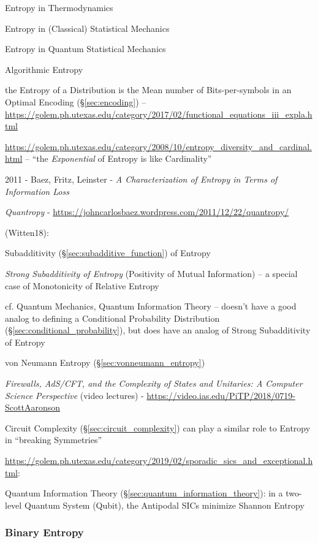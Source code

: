 Entropy in Thermodynamics

Entropy in (Classical) Statistical Mechanics

Entropy in Quantum Statistical Mechanics

Algorithmic Entropy

the Entropy of a Distribution is the Mean number of Bits-per-symbols in an
Optimal Encoding (\S\ref{sec:encoding}) --
\url{https://golem.ph.utexas.edu/category/2017/02/functional_equations_iii_expla.html}

\url{https://golem.ph.utexas.edu/category/2008/10/entropy_diversity_and_cardinal.html}
-- ``the \emph{Exponential} of Entropy is like Cardinality''

2011 - Baez, Fritz, Leinster - \emph{A Characterization of Entropy in Terms of
  Information Loss}

\emph{Quantropy} -
\url{https://johncarlosbaez.wordpress.com/2011/12/22/quantropy/}

\asterism

(Witten18):

Subadditivity (\S\ref{sec:subadditive_function}) of Entropy

\emph{Strong Subadditivity of Entropy} (Positivity of Mutual Information) --
a special case of Monotonicity of Relative Entropy

cf. Quantum Mechanics, Quantum Information Theory
-- doesn't have a good analog to defining a Conditional Probability Distribution
(\S\ref{sec:conditional_probability}), but does have an analog of Strong
Subadditivity of Entropy

\fist von Neumann Entropy (\S\ref{sec:vonneumann_entropy})

\asterism

\emph{Firewalls, AdS/CFT, and the Complexity of States and Unitaries: A Computer
  Science Perspective}
(video lectures)
-
\url{https://video.ias.edu/PiTP/2018/0719-ScottAaronson}

Circuit Complexity (\S\ref{sec:circuit_complexity}) can play a similar role to
Entropy in ``breaking Symmetries''

\asterism

\url{https://golem.ph.utexas.edu/category/2019/02/sporadic_sics_and_exceptional.html}:

Quantum Information Theory (\S\ref{sec:quantum_information_theory}): in a
two-level Quantum System (Qubit), the Antipodal SICs minimize Shannon Entropy



\subsubsection{Binary Entropy}\label{sec:binary_entropy}

